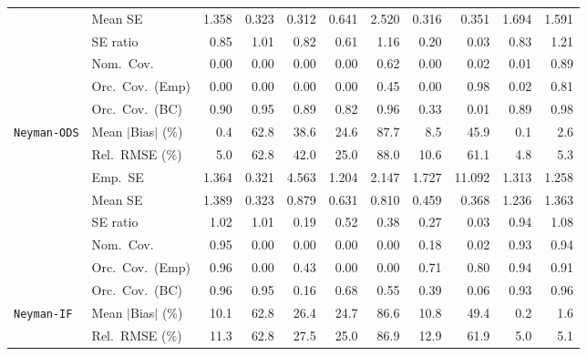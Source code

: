 \begin{landscape}
\begin{longtable}{llrrrrrrrrr}
 & Mean SE & 1.358 & 0.323 & 0.312 & 0.641 & 2.520 & 0.316 & 0.351 & 1.694 & 1.591 \\
 & SE ratio & \cellcolor{ranktwo}0.85 & \cellcolor{rankone}1.01 & 0.82 & 0.61 & \cellcolor{rankthree}1.16 & 0.20 & 0.03 & 0.83 & 1.21 \\
 & Nom.\ Cov. & 0.00 & 0.00 & 0.00 & 0.00 & \cellcolor{ranktwo}0.62 & 0.00 & \cellcolor{rankthree}0.02 & 0.01 & \cellcolor{rankone}0.89 \\
 & Orc.\ Cov.\ (Emp) & 0.00 & 0.00 & 0.00 & 0.00 & \cellcolor{rankthree}0.45 & 0.00 & \cellcolor{rankone}0.98 & 0.02 & \cellcolor{ranktwo}0.81 \\
 & Orc.\ Cov.\ (BC) & 0.90 & \cellcolor{rankone}0.95 & 0.89 & 0.82 & \cellcolor{ranktwo}0.96 & 0.33 & 0.01 & 0.89 & \cellcolor{rankthree}0.98 \\
\addlinespace[2pt]
\quad \texttt{Neyman-ODS} & Mean $|$Bias$|$ (\%) & \cellcolor{ranktwo}0.4 & 62.8 & 38.6 & 24.6 & 87.7 & 8.5 & 45.9 & \cellcolor{rankone}0.1 & \cellcolor{rankthree}2.6 \\
 & Rel.\ RMSE (\%) & \cellcolor{ranktwo}5.0 & 62.8 & 42.0 & 25.0 & 88.0 & 10.6 & 61.1 & \cellcolor{rankone}4.8 & \cellcolor{rankthree}5.3 \\
 & Emp.\ SE & 1.364 & 0.321 & 4.563 & 1.204 & 2.147 & 1.727 & 11.092 & 1.313 & 1.258 \\
 & Mean SE & 1.389 & 0.323 & 0.879 & 0.631 & 0.810 & 0.459 & 0.368 & 1.236 & 1.363 \\
 & SE ratio & \cellcolor{ranktwo}1.02 & \cellcolor{rankone}1.01 & 0.19 & 0.52 & 0.38 & 0.27 & 0.03 & \cellcolor{rankthree}0.94 & 1.08 \\
 & Nom.\ Cov. & \cellcolor{rankone}0.95 & 0.00 & 0.00 & 0.00 & 0.00 & 0.18 & 0.02 & \cellcolor{rankthree}0.93 & \cellcolor{ranktwo}0.94 \\
 & Orc.\ Cov.\ (Emp) & \cellcolor{rankone}0.96 & 0.00 & 0.43 & 0.00 & 0.00 & 0.71 & \cellcolor{rankthree}0.80 & \cellcolor{rankone}0.94 & \cellcolor{ranktwo}0.91 \\
 & Orc.\ Cov.\ (BC) & \cellcolor{ranktwo}0.96 & \cellcolor{rankone}0.95 & 0.16 & 0.68 & 0.55 & 0.39 & 0.06 & \cellcolor{rankthree}0.93 & \cellcolor{ranktwo}0.96 \\
\addlinespace[2pt]
\quad \texttt{Neyman-IF} & Mean $|$Bias$|$ (\%) & \cellcolor{rankthree}10.1 & 62.8 & 26.4 & 24.7 & 86.6 & 10.8 & 49.4 & \cellcolor{rankone}0.2 & \cellcolor{ranktwo}1.6 \\
 & Rel.\ RMSE (\%) & \cellcolor{rankthree}11.3 & 62.8 & 27.5 & 25.0 & 86.9 & 12.9 & 61.9 & \cellcolor{rankone}5.0 & \cellcolor{ranktwo}5.1 \\

\end{longtable}
\end{landscape}
